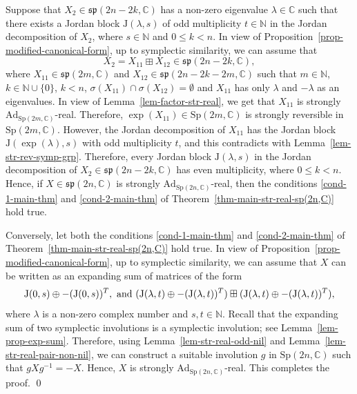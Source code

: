 \documentclass[11pt,reqno]{amsart}
\numberwithin{equation}{section}
\theoremstyle{definition}
\def\C{\mathbb C}
\def\N{\mathbb N}
\def\C{\mathbb {C}}
\def\N{\mathbb {N}}
\newcommand{\thmref}[1]{Theorem~\ref{#1}}
\newcommand{\lemref}[1]{Lemma~\ref{#1}}
\newcommand{\propref}[1]{Proposition~\ref{#1}}
\begin{document}
Suppose that $X_2 \in \mathfrak{sp}(2n-2k,\mathbb{C})$ has a non-zero eigenvalue $\lambda \in \C$ such that there exists a Jordan block $\mathrm{J}(\lambda, s)$ of odd multiplicity $t\in \N$ in the Jordan decomposition of $X_2$, where $s \in \N$ and $0 \leq k <n$. In view of \propref{prop-modified-canonical-form}, up to symplectic similarity, we can assume that 
$$X_2 = X_{11} \boxplus  X_{12} \in \mathfrak{sp}(2n-2k,\mathbb{C}),$$ where $X_{11} \in \mathfrak{sp}(2m,\mathbb{C})$ and $X_{12} \in \mathfrak{sp}(2n-2k-2m,\mathbb{C})$ such that $m \in \N$, $k \in \N \cup \{0\}$, $ k < n$, $\sigma( X_{11}) \cap \sigma( X_{12}) =  \emptyset$ and $X_{11}$ has only $\lambda$ and $-\lambda$ as an eigenvalues. In view of  \lemref{lem-factor-str-real}, we get that $X_{11}$ is strongly $\mathrm{Ad}_{\mathrm{Sp}(2m,\mathbb{C})}$-real.   Therefore, $\exp(X_{11}) \in \mathrm{Sp}(2m,\mathbb{C})$ is strongly reversible in $\mathrm{Sp}(2m,\mathbb{C})$. However, the Jordan decomposition of $X_{11}$ has the Jordan block $\mathrm{J}(\exp(\lambda), s)$ with odd multiplicity $t$, and this contradicts with  \lemref{lem-str-rev-symp-grp}. Therefore, every Jordan block $\mathrm{J}(\lambda, s)$ in the Jordan decomposition of $X_2 \in \mathfrak{sp}(2n-2k,\mathbb{C}) $ has even multiplicity, where $0 \leq k<n$.
Hence,  if $X \in \mathfrak{sp}(2n,\mathbb{C})$  is strongly $\mathrm{Ad}_{\mathrm{Sp}(2n,\mathbb{C})}$-real, then the conditions \eqref{cond-1-main-thm}  and \eqref{cond-2-main-thm}  of \thmref{thm-main-str-real-sp(2n,C)} hold true. 

Conversely, let both  the conditions \eqref{cond-1-main-thm} and \eqref{cond-2-main-thm}  of \thmref{thm-main-str-real-sp(2n,C)} hold true. In view of \propref{prop-modified-canonical-form}, up to symplectic similarity, we can assume that $X$ can be written as an expanding sum of matrices of the form
\begin{equation*}
	\mathrm{J}(0, s) \oplus - (\mathrm{J}(0, s))^{T}, \hbox{ and } (\mathrm{J}(\lambda, t) \oplus - (\mathrm{J}(\lambda, t))^{T}) \boxplus (\mathrm{J}(\lambda, t) \oplus - (\mathrm{J}(\lambda, t))^{T}),
\end{equation*}
where $\lambda$ is a non-zero complex number and $s,t \in \N$. Recall that the expanding sum of two symplectic involutions is a symplectic involution; see  \lemref{lem-prop-exp-sum}. 
Therefore,  using  \lemref{lem-str-real-odd-nil}
and \lemref{lem-str-real-pair-non-nil}, we can construct a suitable involution $g$ in $\mathrm{Sp}(2n,\mathbb{C})$ such that $gXg^{-1} = -X$. Hence, $X$ is strongly $\mathrm{Ad}_{\mathrm{Sp}(2n,\mathbb{C})}$-real.  This completes the proof. 
\qed
\end{document}
